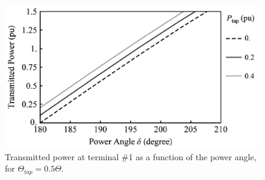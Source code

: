 \documentclass[12pt,a4paper]{reportmod}
\begin{document}
\begin{figure}[h]
\label{fig:seriestaptppa}
\begin{center}
\includegraphics[scale=0.3]{seriestaptppa.png}
\caption{Transmitted power at terminal \#1 as a function of the power angle, for $\Theta_{tap}=0.5\Theta$.}
\end{center}
\end{figure}
\end{document}
